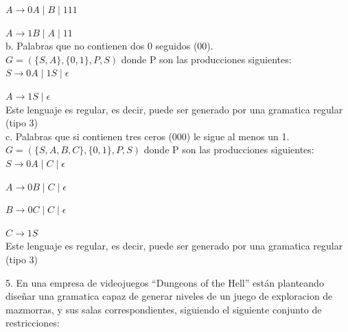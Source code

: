 \documentclass{article}
\begin{document}
\hspace{2cm}$A \rightarrow 0A \mid B \mid 111$

\hspace{2cm}$A \rightarrow 1B \mid A \mid 11$\\

 \hspace{1cm}b. Palabras que no contienen dos 0 seguidos (00).\\

\hspace{2cm}$G = (\{S,A\},\{0,1\},P,S)$ donde P son las producciones siguientes:\\
	
\hspace{2cm}$S \rightarrow 0A \mid 1S \mid \epsilon$

\hspace{2cm}$A \rightarrow 1S \mid \epsilon$\\

\hspace{2cm}Este lenguaje es regular, es decir, puede ser generado por una gramatica regular (tipo 3)\\

\hspace{1cm}c. Palabras que si contienen tres ceros (000) le sigue al menos un 1.\\

\hspace{2cm}	$G = (\{S,A,B,C\},\{0,1\},P,S)$ donde P son las producciones siguientes:\\

\hspace{2cm}	$S \rightarrow 0A \mid C \mid \epsilon$
	
\hspace{2cm}	$A \rightarrow 0B \mid C \mid \epsilon$

\hspace{2cm}	$B \rightarrow 0C \mid C \mid \epsilon$

\hspace{2cm}	$C \rightarrow 1S$\\

\hspace{2cm}	Este lenguaje es regular, es decir, puede ser generado por una gramatica regular (tipo 3)\\

\vspace{0,65cm}

5. En una empresa de videojuegos “Dungeons of the Hell” están planteando diseñar una gramatica capaz de generar niveles de un juego de exploracion de mazmorras, y sus salas correspondientes, siguiendo el siguiente conjunto de restricciones:\\
\end{document}

